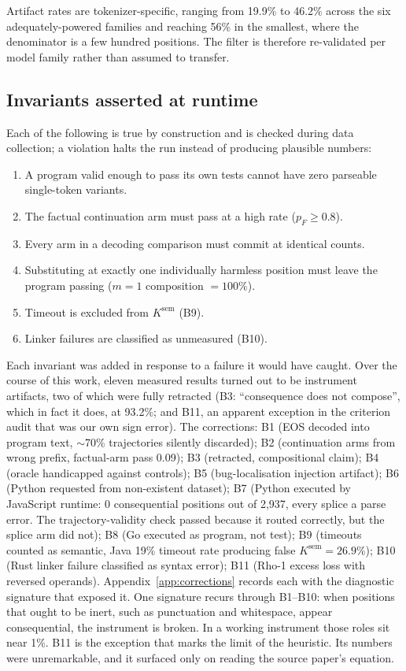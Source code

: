 \documentclass[twoside,11pt]{article}
\begin{document}
Artifact rates are tokenizer-specific, ranging from 19.9\% to 46.2\% across the six adequately-powered families and reaching 56\% in the smallest, where the denominator is a few hundred positions.
The filter is therefore re-validated per model family rather than assumed to transfer.

\subsection{Invariants asserted at runtime}
\label{sec:invariants}

Each of the following is true by construction and is checked during data collection; a
violation halts the run instead of producing plausible numbers:
\begin{enumerate}
\item A program valid enough to pass its own tests cannot have zero parseable single-token variants.
\item The factual continuation arm must pass at a high rate ($p_F \geq 0.8$).
\item Every arm in a decoding comparison must commit at identical counts.
\item Substituting at exactly one individually harmless position must leave the program passing ($m=1$ composition $= 100\%$).
\item Timeout is excluded from $K^{\mathrm{sem}}$ (B9).
\item Linker failures are classified as unmeasured (B10).
\end{enumerate}

Each invariant was added in response to a failure it would have caught. Over the course of this
work, eleven measured results turned out to be instrument artifacts, two of which were fully
retracted (B3: ``consequence does not compose'', which in fact it does, at 93.2\%; and B11, an
apparent exception in the criterion audit that was our own sign error). The
corrections: B1 (EOS decoded into program text, $\sim$70\% trajectories silently discarded);
B2 (continuation arms from wrong prefix, factual-arm pass 0.09); B3 (retracted, compositional
claim); B4 (oracle handicapped against controls); B5 (bug-localisation injection artifact);
B6 (Python requested from non-existent dataset); B7 (Python executed by JavaScript runtime: 0
consequential positions out of 2,937, every splice a parse error. The trajectory-validity check
passed because it routed correctly, but the splice arm did not); B8 (Go executed as program, not
test); B9 (timeouts counted as semantic, Java 19\% timeout rate producing false
$K^{\mathrm{sem}} = 26.9\%$); B10 (Rust linker failure classified as syntax error); B11 (Rho-1 excess loss with reversed
operands). Appendix~\ref{app:corrections} records each
with the diagnostic signature that exposed it. One signature recurs through B1--B10: when positions
that ought to be inert, such as punctuation and whitespace, appear consequential, the instrument is
broken. In a working instrument those roles sit near 1\%. B11 is the exception that marks the
limit of the heuristic. Its numbers were unremarkable, and it surfaced only on reading the source
paper's equation.
\end{document}
